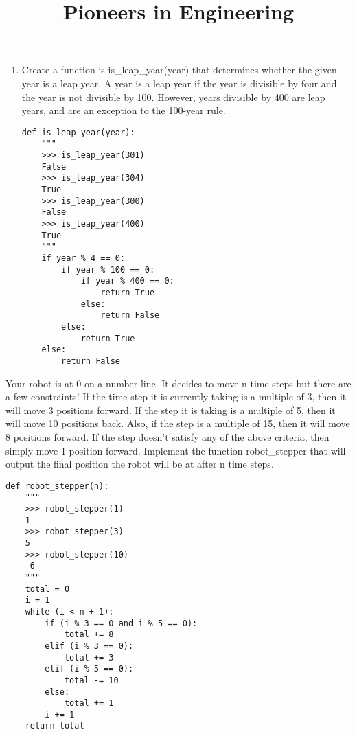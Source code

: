 \documentclass[twoside]{article}
\title{\sc Pioneers in Engineering}
\begin{document}
\thispagestyle{empty}
\maketitle

\begin{enumerate}

\begin{enumerate}
\item Create a function is is\_leap\_year(year) that determines whether the given year is a leap year. A year is a leap year if the year is divisible by four and the year is not divisible by 100. However, years divisible by 400 are leap years, and are an exception to the 100-year rule.

\begin{lstlisting}
def is_leap_year(year):
    """
    >>> is_leap_year(301)
    False
    >>> is_leap_year(304)
    True
    >>> is_leap_year(300)
    False
    >>> is_leap_year(400)
    True
    """
    if year % 4 == 0:
        if year % 100 == 0:
            if year % 400 == 0:
                return True
            else:
                return False
        else:
            return True
    else:
        return False

\end{lstlisting}
\end{enumerate}

\vspace{0.2in}


\begin{enumerate}
Your robot is at 0 on a number line. It decides to move n time steps but there are a few constraints! If the time step it is currently taking is a multiple of 3, then it will move 3 positions forward. If the step it is taking is a multiple of 5, then it will move 10 positions back. Also, if the step is a multiple of 15, then it will move 8 positions forward. If the step doesn't satisfy any of the above criteria, then simply move 1 position forward. Implement the function robot\_stepper that will output the final position the robot will be at after n time steps.

\begin{lstlisting}
def robot_stepper(n):
    """
    >>> robot_stepper(1)
    1
    >>> robot_stepper(3)
    5
    >>> robot_stepper(10)
    -6
    """
    total = 0
    i = 1
    while (i < n + 1):
        if (i % 3 == 0 and i % 5 == 0):
            total += 8
        elif (i % 3 == 0):
            total += 3
        elif (i % 5 == 0):
            total -= 10
        else:
            total += 1
        i += 1
    return total
    

\end{lstlisting}
\end{enumerate}
\end{enumerate}
\end{document}
